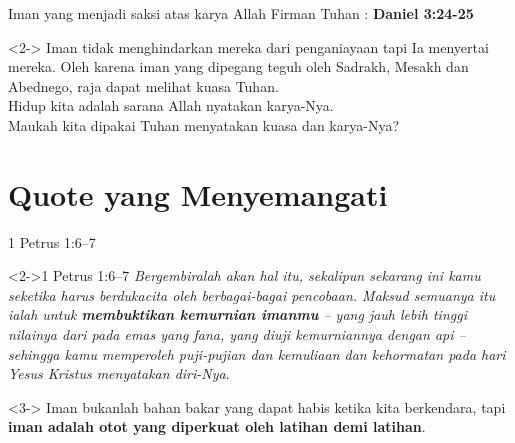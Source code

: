 \documentclass[english,t]{beamer}
\begin{document}
\begin{frame}{Iman yang menjadi saksi atas karya Allah}
	Firman Tuhan : \textbf{Daniel 3:24-25}
	\begin{block}<2->{}
		Iman tidak menghindarkan mereka dari penganiayaan tapi Ia menyertai mereka. Oleh karena iman yang dipegang teguh oleh Sadrakh, Mesakh dan Abednego, raja dapat melihat kuasa Tuhan. \\
		Hidup kita adalah sarana Allah nyatakan karya-Nya. \\
		Maukah kita dipakai Tuhan menyatakan kuasa dan karya-Nya?
	\end{block}
\end{frame}

\section{Quote yang Menyemangati}
\begin{frame}{1 Petrus 1:6--7}
	\begin{block}<2->{1 Petrus 1:6--7}
		\textit{Bergembiralah akan hal itu, sekalipun sekarang ini kamu seketika harus berdukacita oleh berbagai-bagai pencobaan. Maksud semuanya itu ialah untuk \textbf{membuktikan kemurnian imanmu} -- yang jauh lebih tinggi nilainya dari pada emas yang fana, yang diuji kemurniannya dengan api -- sehingga kamu memperoleh puji-pujian dan kemuliaan dan kehormatan pada hari Yesus Kristus menyatakan diri-Nya}.
	\end{block}

	\begin{block}<3->{}
		Iman bukanlah bahan bakar yang dapat habis ketika kita berkendara, tapi \textbf{iman adalah otot yang diperkuat oleh latihan demi latihan}.
	\end{block}
\end{frame}
\end{document}
